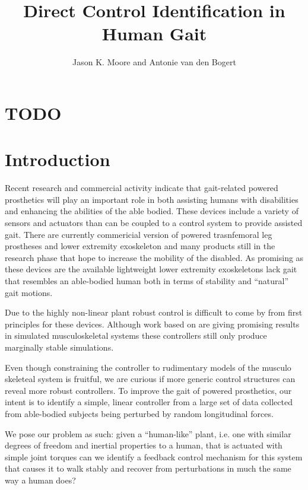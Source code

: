 \documentclass{article}
\author{Jason K. Moore and Antonie van den Bogert}
\title{Direct Control Identification in Human Gait}
\date{}
\begin{document}
\maketitle

\section*{TODO}

\listoftodos

\begin{abstract}
\end{abstract}

\section*{Introduction}
%
Recent research and commercial activity indicate that gait-related powered
prosthetics will play an important role in both assisting humans with
disabilities and enhancing the abilities of the able bodied. These devices
include a variety of sensors and actuators than can be coupled to a control
system to provide assisted gait. There are currently commericial version of
powered trasnfemoral leg prostheses \cite{BiOM} and lower extremity exoskeleton
\cite{ReWalk} and many products still in the research phase
\cite{Ekso,Parker,Goldfarb,etc} that hope to increase the mobility of the
disabled. As promising as these devices are the available
lightweight lower extremity exoskeletons lack gait that resembles an
able-bodied human both in terms of stability and ``natural'' gait motions.

Due to the highly non-linear plant robust control is difficult to come by from
first principles for these devices. Although work based on \cite{Geyer2010} are
giving promising results in simulated musculoskeletal systems \cite{Wang2012,
Geitenbeek2013} these controllers still only produce marginally stable
simulations.

Even though constraining the controller to rudimentary models of the musculo
skeleteal system is fruitful, we are curious if more generic control structures
can reveal more robust controllers. To improve the gait of powered prosthetics,
our intent is to identify a simple, linear controller from a large set of data
collected from able-bodied subjects being perturbed by random longitudinal
forces.

We pose our problem as such: given a ``human-like'' plant, i.e. one with
similar degrees of freedom and inertial properties to a human, that is actuated
with simple joint torques can we identify a feedback control mechanism for this
system that causes it to walk stably and recover from perturbations in much the
same way a human does?
\end{document}
